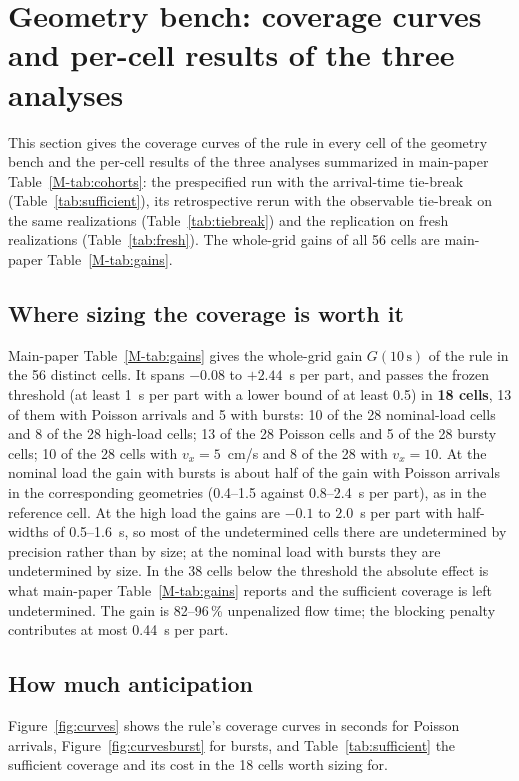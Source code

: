 \documentclass[11pt,a4paper]{article}
\begin{document}
\section{Geometry bench: coverage curves and per-cell results of the three analyses}\label{sup:cohorts}
This section gives the coverage curves of the rule in every cell of the geometry bench and
the per-cell results of the three analyses summarized in main-paper
Table~\ref{M-tab:cohorts}: the prespecified run with the arrival-time tie-break
(Table~\ref{tab:sufficient}), its retrospective rerun with the observable tie-break on the
same realizations (Table~\ref{tab:tiebreak}) and the replication on fresh realizations
(Table~\ref{tab:fresh}). The whole-grid gains of all 56 cells are main-paper
Table~\ref{M-tab:gains}.

\subsection{Where sizing the coverage is worth it}\label{sup:worth}
Main-paper Table~\ref{M-tab:gains} gives the whole-grid gain $G(10\,\mathrm{s})$ of the rule in the 56
distinct cells. It spans $-0.08$ to $+2.44$~s per part, and passes the frozen threshold
(at least 1~s per part with a lower bound of at least 0.5) in \textbf{18 cells}, 13 of them
with Poisson arrivals and 5 with bursts: 10 of the 28 nominal-load cells and 8 of the 28
high-load cells; 13 of the 28 Poisson cells and 5 of the 28 bursty cells; 10 of the 28
cells with $v_x=5$~cm/s and 8 of the 28 with $v_x=10$. At the nominal load the gain with bursts is about half of the gain with Poisson
arrivals in the corresponding geometries (0.4--1.5 against 0.8--2.4~s per part), as in
the reference cell. At the high load the gains are $-0.1$ to $2.0$~s per part with half-widths of
0.5--1.6~s, so most of the undetermined cells there are undetermined by precision rather
than by size; at the nominal load with bursts they are undetermined by size. In the 38
cells below the threshold the absolute effect is what main-paper Table~\ref{M-tab:gains} reports and
the sufficient coverage is left undetermined. The gain is 82--96\,\% unpenalized flow
time; the blocking penalty contributes at most 0.44~s per part.
\subsection{How much anticipation}\label{sup:howmuch}\label{sup:curves}
Figure~\ref{fig:curves} shows the rule's coverage curves in seconds for Poisson arrivals,
Figure~\ref{fig:curvesburst} for bursts, and Table~\ref{tab:sufficient} the sufficient
coverage and its cost in the 18 cells worth sizing for.
\end{document}
